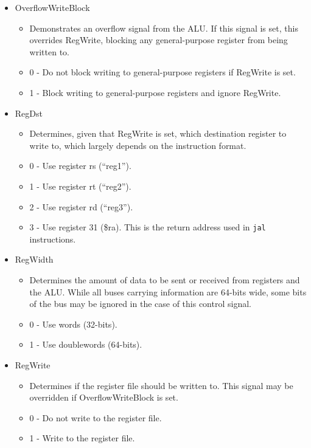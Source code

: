 \documentclass[
    paper=letter,
    parskip=half,
    fontsize=12pt,
    titlepage=firstiscover,
    toc=bibliography,
    numbers=endperiod
]{scrartcl}
\providecommand{\tightlist}{%
  \setlength{\itemsep}{0pt}\setlength{\parskip}{0pt}}
\begin{document}
\begin{itemize}
    \item OverflowWriteBlock
          \begin{itemize}
              \tightlist
              \item Demonstrates an overflow signal from the ALU. If this signal is set,
                    this overrides RegWrite, blocking any general-purpose register from
                    being written to.
              \item 0 - Do not block writing to general-purpose registers if RegWrite is set.
              \item 1 - Block writing to general-purpose registers and ignore RegWrite.
          \end{itemize}

    \item RegDst
          \begin{itemize}
              \tightlist
              \item Determines, given that RegWrite is set, which destination register to
                    write to, which largely depends on the instruction format.
              \item 0 - Use register rs (``reg1'').
              \item 1 - Use register rt (``reg2'').
              \item 2 - Use register rd (``reg3'').
              \item 3 - Use register 31 (\$ra). This is the return address used in \texttt{jal} instructions.
          \end{itemize}

    \item RegWidth
          \begin{itemize}
              \tightlist
              \item Determines the amount of data to be sent or received from registers and
                    the ALU. While all buses carrying information are 64-bits wide, some
                    bits of the bus may be ignored in the case of this control signal.
              \item 0 - Use words (32-bits).
              \item 1 - Use doublewords (64-bits).
          \end{itemize}

    \item RegWrite
          \begin{itemize}
              \tightlist
              \item Determines if the register file should be written to. This signal may be
                    overridden if OverflowWriteBlock is set.
              \item 0 - Do not write to the register file.
              \item 1 - Write to the register file.
          \end{itemize}
\end{itemize}
\end{document}
